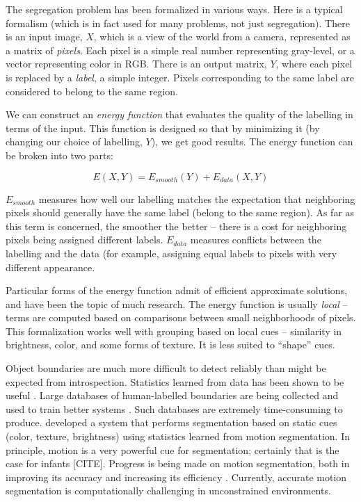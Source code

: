 The segregation problem has been formalized in various ways.  Here is
a typical formalism (which is in fact used for many problems, not just
segregation).  There is an input image, $X$, which is a view of the
world from a camera, represented as a matrix of {\em pixels}.  Each
pixel is a simple real number representing gray-level, or a vector
representing color in RGB.
%
There is an output matrix, $Y$, where each pixel is replaced by
a {\em label}, a simple integer.  Pixels corresponding to the 
same label are considered to belong to the same region.

We can construct an {\em energy function} that evaluates the quality
of the labelling in terms of the input.  This function is designed so
that by minimizing it (by changing our choice of labelling, $Y$), we
get good results.  The energy function can be broken into two
parts:

\begin{displaymath}
%
E(X,Y) = E_{smooth}(Y) + E_{data}(X,Y)
%
\end{displaymath}

$E_{smooth}$ measures how well our labelling matches the
expectation that neighboring pixels should generally have the
same label (belong to the same region).
As far as this term is concerned, the smoother the better -- there is
a cost for neighboring pixels being assigned different labels.
$E_{data}$ measures conflicts between the labelling and the data (for
example, assigning equal labels to pixels with very different
appearance.

Particular forms of the energy function admit of efficient 
approximate solutions, and have been the topic of much research.
%
The energy function is usually {\em local} -- terms are computed 
based on comparisons between small neighborhoods of pixels.
%
This formalization works well with grouping based on local
cues -- similarity in brightness, color, and some forms of texture.
It is less suited to ``shape'' cues.


Object boundaries are much more difficult to detect reliably than might be 
expected from introspection.
Statistics learned from data has been shown to be useful
\cite{konishi03statistical}.  Large databases of 
human-labelled boundaries are being collected and
used to train better systems
\cite{martin04learning}.
%
Such databases are extremely time-consuming to produce.
%
 developed a system that performs
segmentation based on static cues (color, texture, brightness)
using statistics learned from motion segmentation.
In principle, motion is a very powerful cue for
segmentation; certainly that is the case for infants
[CITE].
%
Progress is being made on motion segmentation, both 
in improving its accuracy and increasing its efficiency
 \cite{cremers05motion,fowlkes04spectral,smith03motion,smith04layered}.
%
Currently, accurate motion segmentation is 
computationally challenging in unconstrained environments.


